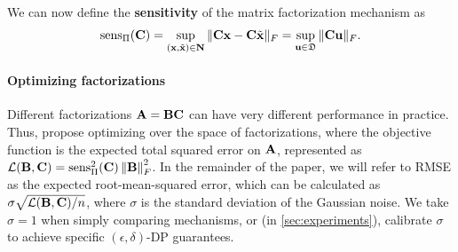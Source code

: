 \documentclass{article}
\newtheorem{definition}{Definition}
\begin{document}
We can now define the \textbf{sensitivity} of the matrix factorization mechanism as
\begin{equation}\label{eq:sensopnorm}
\operatorname{sens}_\Pi(\mathbf{C}) = \sup_{(\mathbf{x}, \tilde{\mathbf{x}}) \in \mathbf{N}} \| \mathbf{C} \mathbf{x} - \mathbf{C} \tilde{\mathbf{x}} \|_F
 = \sup_{\mathbf{u} \in \mathfrak{D}} \| \mathbf{C}\mathbf{u} \|_F. 
\end{equation}
%

%
\paragraph{Optimizing factorizations}
Different factorizations $\mathbf{A} = \mathbf{B} \mathbf{C}$ can have very different performance in practice.  Thus, \citet{denisov22matfact,choquette2022multi} propose optimizing over the space of factorizations, where the objective function is the expected total squared error on $\mathbf{A}$, represented as $\mathcal{L}(\mathbf{B}, \mathbf{C}) = \operatorname{sens}_\Pi^2(\mathbf{C}) \left\|\mathbf{B}\right\|_F^2$.  In the remainder of the paper, we will refer to RMSE as the expected root-mean-squared error, which can be calculated as $\sigma \sqrt{\mathcal{L}(\mathbf{B}, \mathbf{C}) / n}$, where $\sigma$ is the standard deviation of the Gaussian noise. We take $\sigma=1$ when simply comparing mechanisms, or (in \cref{sec:experiments}), calibrate $\sigma$ to achieve specific $(\epsilon, \delta)$-DP guarantees.
\end{document}
